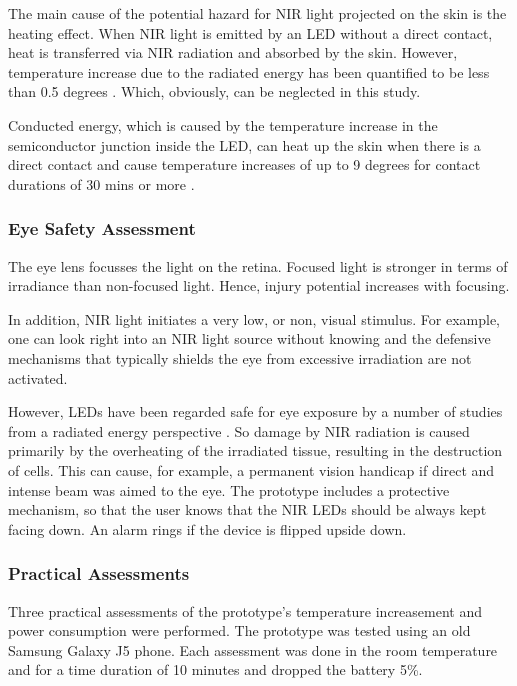The main cause of the potential hazard for NIR light projected on the skin is the heating effect. When NIR light is emitted by an LED without a direct contact, heat is transferred via NIR radiation and absorbed by the skin. However, temperature increase due to the radiated energy has been quantified to be less than 0.5 degrees \parencite{ledSafety}. Which, obviously, can be neglected in this study.

Conducted energy, which is caused by the temperature increase in the semiconductor junction inside the LED, can heat up the skin when there is a direct contact and cause temperature increases of up to 9 degrees for contact durations of 30 mins or more \parencite{ledSafety}.

\subsubsection {Eye Safety Assessment}
The eye lens focusses the light on the retina. Focused light is stronger in terms of irradiance than non-focused light. Hence, injury potential increases with focusing.

In addition, NIR light initiates a very low, or non, visual stimulus. For example, one can look right into an NIR light source without knowing and the defensive mechanisms that typically shields the eye from excessive irradiation are not activated.

However, LEDs have been regarded safe for eye exposure by a number of studies from a radiated energy perspective \parencite{ledEyeSafe1} \parencite{ledEyeSafe2}.
So damage by NIR radiation is caused primarily by the overheating of the irradiated tissue, resulting in the destruction of cells. This can cause, for example, a permanent vision handicap \parencite{ledEyeSafe3} if direct and intense beam was aimed to the eye.
The prototype includes a protective mechanism, so that the user knows that the NIR LEDs should be always kept facing down. An alarm rings if the device is flipped upside down.


\subsubsection{Practical Assessments}
Three practical assessments of the prototype’s temperature increasement and power consumption were performed. The prototype was tested using an old Samsung Galaxy J5 phone. Each assessment was done in the room temperature and for a time duration of 10 minutes and dropped the battery 5\%.

